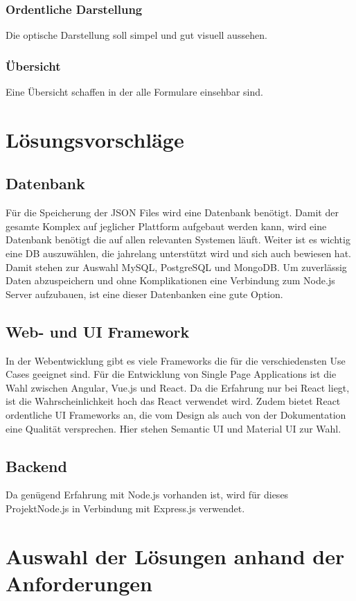 \documentclass[a4paper,11pt]{scrreprt}
\begin{document}
\subsection{Ordentliche Darstellung}
Die optische Darstellung soll simpel und gut visuell aussehen.
\subsection{Übersicht}
Eine Übersicht schaffen in der alle Formulare einsehbar sind. 
 

\chapter{Lösungsvorschläge}
\section{Datenbank}
Für die Speicherung der JSON Files wird eine Datenbank benötigt. Damit der gesamte Komplex auf jeglicher Plattform aufgebaut werden kann, wird eine Datenbank benötigt die auf allen relevanten Systemen läuft. Weiter ist es wichtig eine DB auszuwählen, die jahrelang unterstützt wird und sich auch bewiesen hat. Damit stehen zur Auswahl MySQL, PostgreSQL und MongoDB. Um zuverlässig Daten abzuspeichern und ohne Komplikationen eine Verbindung zum Node.js Server aufzubauen, ist eine dieser Datenbanken eine gute Option. 


\section{Web- und UI Framework}
In der Webentwicklung gibt es viele Frameworks die für die verschiedensten Use Cases geeignet sind. Für die Entwicklung von Single Page Applications ist die Wahl zwischen Angular, Vue.js und React. Da die Erfahrung nur bei React liegt, ist die Wahrscheinlichkeit hoch das React verwendet wird. Zudem bietet React ordentliche UI Frameworks an, die vom Design als auch von der Dokumentation eine Qualität versprechen. Hier stehen Semantic UI und Material UI zur Wahl.


\section{Backend}
Da genügend Erfahrung mit Node.js vorhanden ist, wird für dieses ProjektNode.js in Verbindung mit Express.js verwendet. 



\chapter{Auswahl der Lösungen anhand der Anforderungen}
\end{document}
